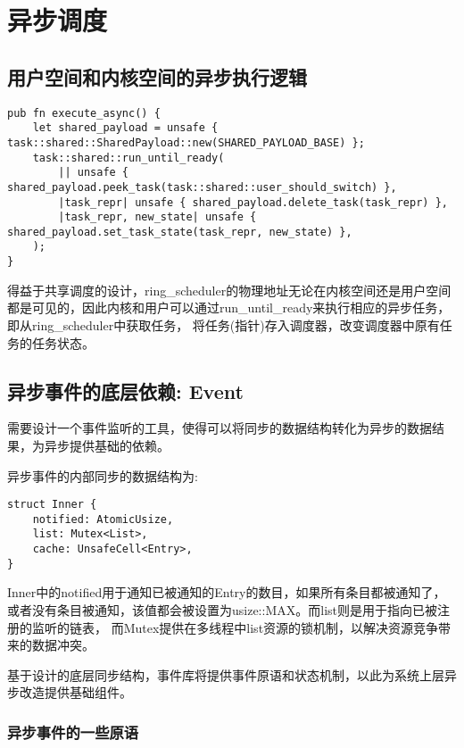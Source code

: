 \section{异步调度}

\subsection{用户空间和内核空间的异步执行逻辑}

\begin{lstlisting}[caption=用户空间的异步逻辑]
pub fn execute_async() {
    let shared_payload = unsafe { task::shared::SharedPayload::new(SHARED_PAYLOAD_BASE) };
    task::shared::run_until_ready(
        || unsafe { shared_payload.peek_task(task::shared::user_should_switch) },
        |task_repr| unsafe { shared_payload.delete_task(task_repr) },
        |task_repr, new_state| unsafe { shared_payload.set_task_state(task_repr, new_state) },
    );
}
\end{lstlisting}

得益于共享调度的设计，ring\_scheduler的物理地址无论在内核空间还是用户空间都是可见的，因此内核和用户可以通过run\_until\_ready来执行相应的异步任务， 即从ring\_scheduler中获取任务， 将任务(指针)存入调度器，改变调度器中原有任务的任务状态。


\subsection{异步事件的底层依赖: Event}

需要设计一个事件监听的工具，使得可以将同步的数据结构转化为异步的数据结果，为异步提供基础的依赖。

异步事件的内部同步的数据结构为:

\begin{lstlisting}[caption=异步事件底层的同步结构]
struct Inner {
    notified: AtomicUsize,
    list: Mutex<List>,
    cache: UnsafeCell<Entry>,
}
\end{lstlisting}

Inner中的notified用于通知已被通知的Entry的数目，如果所有条目都被通知了，或者没有条目被通知，该值都会被设置为usize::MAX。而list则是用于指向已被注册的监听的链表， 而Mutex提供在多线程中list资源的锁机制，以解决资源竞争带来的数据冲突。

基于设计的底层同步结构，事件库将提供事件原语和状态机制，以此为系统上层异步改造提供基础组件。

\subsubsection{异步事件的一些原语}
\label{sssec:event}

